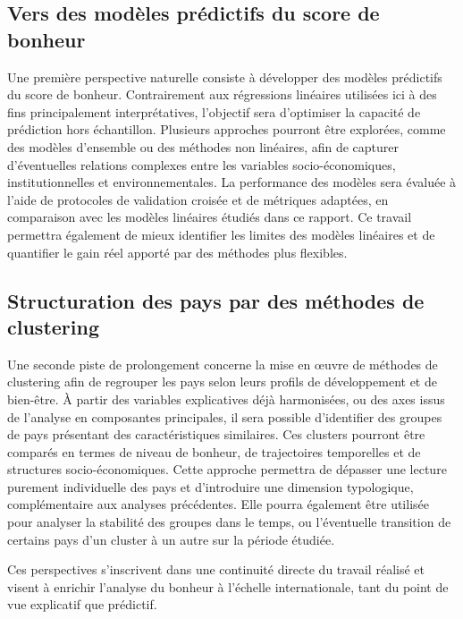 \documentclass{article}
\begin{document}
\subsection{Vers des modèles prédictifs du score de bonheur}

Une première perspective naturelle consiste à développer des modèles prédictifs du score de bonheur.
Contrairement aux régressions linéaires utilisées ici à des fins principalement interprétatives, l’objectif sera d’optimiser la capacité de prédiction hors échantillon.
Plusieurs approches pourront être explorées, comme des modèles d’ensemble ou des méthodes non linéaires, afin de capturer d’éventuelles relations complexes entre les variables socio-économiques, institutionnelles et environnementales.
La performance des modèles sera évaluée à l’aide de protocoles de validation croisée et de métriques adaptées, en comparaison avec les modèles linéaires étudiés dans ce rapport.
Ce travail permettra également de mieux identifier les limites des modèles linéaires et de quantifier le gain réel apporté par des méthodes plus flexibles.

\subsection{Structuration des pays par des méthodes de clustering}

Une seconde piste de prolongement concerne la mise en œuvre de méthodes de clustering afin de regrouper les pays selon leurs profils de développement et de bien-être.
À partir des variables explicatives déjà harmonisées, ou des axes issus de l’analyse en composantes principales, il sera possible d’identifier des groupes de pays présentant des caractéristiques similaires.
Ces clusters pourront être comparés en termes de niveau de bonheur, de trajectoires temporelles et de structures socio-économiques.
Cette approche permettra de dépasser une lecture purement individuelle des pays et d’introduire une dimension typologique, complémentaire aux analyses précédentes.
Elle pourra également être utilisée pour analyser la stabilité des groupes dans le temps, ou l’éventuelle transition de certains pays d’un cluster à un autre sur la période étudiée.

Ces perspectives s’inscrivent dans une continuité directe du travail réalisé et visent à enrichir l’analyse du bonheur à l’échelle internationale, tant du point de vue explicatif que prédictif.

\newpage
\end{document}
